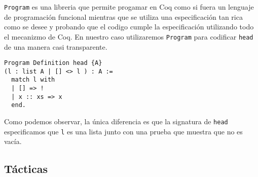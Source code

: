 \lstinline{Program} es una libreria que permite progamar en Coq como si fuera un lenguaje de programación funcional mientras que se utiliza una especificación tan rica como se desee y probando que el codigo cumple la especificación utilizando todo el mecanizmo de Coq. En nuestro caso utilizaremos \lstinline{Program} para codificar \lstinline{head} de una manera casi transparente.
\begin{lstlisting}
Program Definition head {A}
(l : list A | [] <> l ) : A :=
  match l with
  | [] => !
  | x :: xs => x
  end.
\end{lstlisting}
Como podemos observar, la única diferencia es que la signatura de \lstinline{head} especificamos que \lstinline{l} es una lista junto con una prueba que muestra que no es vacía.




\subsection{Tácticas}
